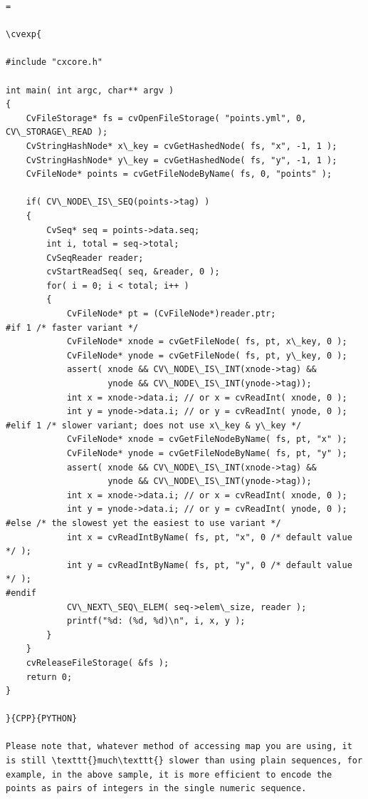 \label{Example. Reading an array of structures from file storage}
\begin{verbatim}=

\cvexp{

#include "cxcore.h"

int main( int argc, char** argv )
{
    CvFileStorage* fs = cvOpenFileStorage( "points.yml", 0, CV\_STORAGE\_READ );
    CvStringHashNode* x\_key = cvGetHashedNode( fs, "x", -1, 1 );
    CvStringHashNode* y\_key = cvGetHashedNode( fs, "y", -1, 1 );
    CvFileNode* points = cvGetFileNodeByName( fs, 0, "points" );

    if( CV\_NODE\_IS\_SEQ(points->tag) )
    {
        CvSeq* seq = points->data.seq;
        int i, total = seq->total;
        CvSeqReader reader;
        cvStartReadSeq( seq, &reader, 0 );
        for( i = 0; i < total; i++ )
        {
            CvFileNode* pt = (CvFileNode*)reader.ptr;
#if 1 /* faster variant */
            CvFileNode* xnode = cvGetFileNode( fs, pt, x\_key, 0 );
            CvFileNode* ynode = cvGetFileNode( fs, pt, y\_key, 0 );
            assert( xnode && CV\_NODE\_IS\_INT(xnode->tag) &&
                    ynode && CV\_NODE\_IS\_INT(ynode->tag));
            int x = xnode->data.i; // or x = cvReadInt( xnode, 0 );
            int y = ynode->data.i; // or y = cvReadInt( ynode, 0 );
#elif 1 /* slower variant; does not use x\_key & y\_key */
            CvFileNode* xnode = cvGetFileNodeByName( fs, pt, "x" );
            CvFileNode* ynode = cvGetFileNodeByName( fs, pt, "y" );
            assert( xnode && CV\_NODE\_IS\_INT(xnode->tag) &&
                    ynode && CV\_NODE\_IS\_INT(ynode->tag));
            int x = xnode->data.i; // or x = cvReadInt( xnode, 0 );
            int y = ynode->data.i; // or y = cvReadInt( ynode, 0 );
#else /* the slowest yet the easiest to use variant */
            int x = cvReadIntByName( fs, pt, "x", 0 /* default value */ );
            int y = cvReadIntByName( fs, pt, "y", 0 /* default value */ );
#endif
            CV\_NEXT\_SEQ\_ELEM( seq->elem\_size, reader );
            printf("%d: (%d, %d)\n", i, x, y );
        }
    }
    cvReleaseFileStorage( &fs );
    return 0;
}

}{CPP}{PYTHON}

Please note that, whatever method of accessing map you are using, it is still \texttt{}much\texttt{} slower than using plain sequences, for example, in the above sample, it is more efficient to encode the points as pairs of integers in the single numeric sequence.


\end{verbatim}

